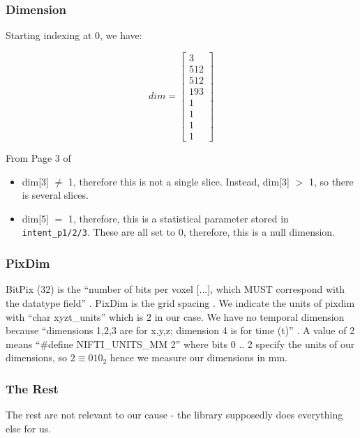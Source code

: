 \documentclass[11pt]{article}
\begin{document}
\subsubsection{Dimension}

Starting indexing at 0, we have: 

\begin{equation*}
    dim = \begin{bmatrix}3 \\ 512 \\ 512 \\ 193 \\ 1 \\ 1 \\ 1 \\ 1\end{bmatrix}
\end{equation*}


From Page 3 of \cite{nifti-data-format} 

\begin{itemize}
    \item dim[3] $\neq$ 1, therefore this is not a single slice. Instead, dim[3] $>$ 1, so there is several slices.
    \item dim[5] $=$ 1, therefore, this is a statistical parameter stored in \texttt{intent\_p1/2/3}. These are all set to 0, therefore, this is a null dimension.
\end{itemize}

\subsubsection{PixDim}

BitPix (32) is the ``number of bits per voxel [...], which MUST correspond with the datatype field'' \cite{nifti-headers}. PixDim is the grid spacing \cite{nifti-headers}. We indicate the units of pixdim with ``char xyzt\_units'' \cite{nifti-headers} which is 2 in our case. We have no temporal dimension because ``dimensions 1,2,3 are for x,y,z; dimension 4 is for time (t)'' \cite{nifti-headers}. A value of 2 means ``\#define NIFTI\_UNITS\_MM      2'' \cite{nifti-headers} where bits 0 .. 2 specify the units of our dimensions, so $2 \equiv 010_2$ hence we measure our dimensions in mm.

\subsubsection{The Rest}

The rest are not relevant to our cause - the library supposedly does everything else for us.
\end{document}
